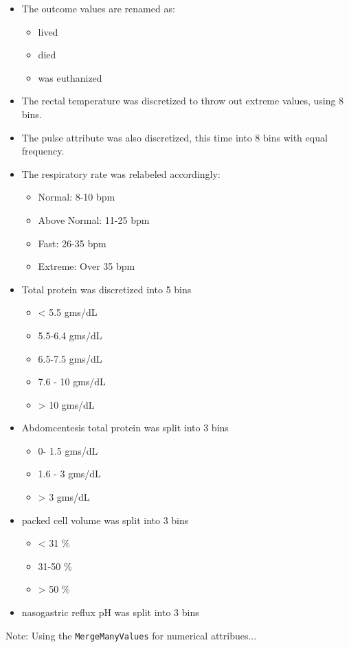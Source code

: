 \begin{itemize}
\item The outcome values are renamed as:
\begin{itemize}
\item lived
\item died
\item was euthanized
\end{itemize}

\item The rectal temperature was discretized to throw out extreme values, using 8 bins.

\item The pulse attribute was also discretized, this time into 8 bins with equal frequency.

\item The respiratory rate was relabeled accordingly:
\begin{itemize}
\item Normal: 8-10 bpm
\item Above Normal: 11-25 bpm
\item Fast: 26-35 bpm
\item Extreme: Over 35 bpm
\end{itemize}

\item Total protein was discretized into 5 bins
\begin{itemize}
\item < 5.5 gms/dL
\item 5.5-6.4 gms/dL
\item 6.5-7.5 gms/dL
\item 7.6 - 10 gms/dL
\item > 10 gms/dL
\end{itemize}


\item Abdomcentesis total protein was split into 3 bins
\begin{itemize}
\item 0- 1.5 gms/dL
\item 1.6 - 3 gms/dL
\item > 3 gms/dL
\end{itemize}

\item packed cell volume was split into 3 bins
\begin{itemize}
\item < 31 \%
\item 31-50 \%
\item > 50 \%
\end{itemize}

\item nasogastric reflux pH was split into 3 bins


\end{itemize}

Note: Using the \verb|MergeManyValues| for numerical attribues...
